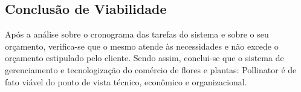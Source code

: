 	\subsection{Conclusão de Viabilidade}
Após a análise sobre o cronograma das tarefas do sistema e sobre o seu orçamento, verifica-se que o mesmo atende às necessidades e não excede o orçamento estipulado pelo cliente. Sendo assim, conclui-se que o sistema de gerenciamento e tecnologização do comércio de flores e plantas: Pollinator é de fato viável do ponto de vista técnico, econômico e organizacional.
